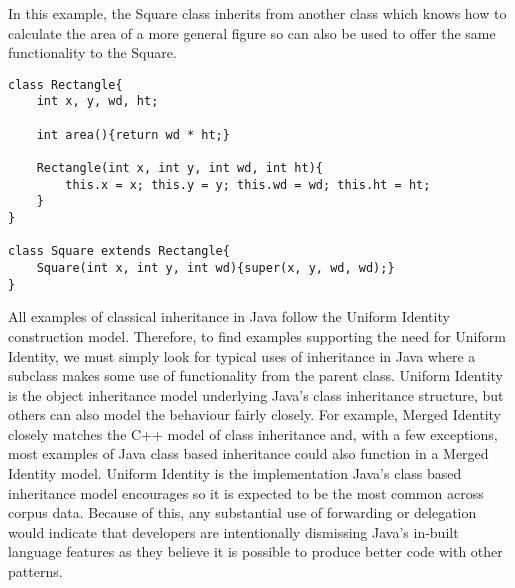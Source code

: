 In this example, the Square class inherits from another class which knows how to calculate the area of a more general figure so can also be used to offer the same functionality to the Square. 
\begin{lstlisting}
class Rectangle{
	int x, y, wd, ht;

	int area(){return wd * ht;}

	Rectangle(int x, int y, int wd, int ht){
		this.x = x; this.y = y; this.wd = wd; this.ht = ht;
	}
}

class Square extends Rectangle{
	Square(int x, int y, int wd){super(x, y, wd, wd);}
}
\end{lstlisting}

All examples of classical inheritance in Java follow the Uniform Identity construction model. Therefore, to find examples supporting the need for Uniform Identity, we must simply look for typical uses of inheritance in Java where a subclass makes some use of functionality from the parent class. Uniform Identity is the object inheritance model underlying Java's class inheritance structure, but others can also model the behaviour fairly closely. For example, Merged Identity closely matches the C++ model of class inheritance and, with a few exceptions, most examples of Java class based inheritance could also function in a Merged Identity model. Uniform Identity is the implementation Java's class based inheritance model encourages so it is expected to be the most common across corpus data. Because of this, any substantial use of forwarding or delegation would indicate that developers are intentionally dismissing Java's in-built language features as they believe it is possible to produce better code with other patterns.